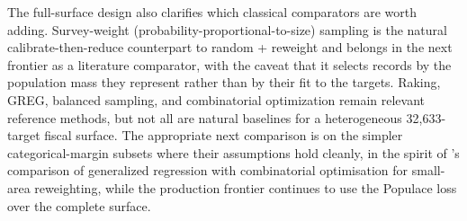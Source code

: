 The full-surface design also clarifies which classical comparators are worth adding. Survey-weight
(probability-proportional-to-size) sampling is the natural calibrate-then-reduce counterpart to random +
reweight and belongs in the next frontier as a literature comparator, with the caveat that it selects
records by the population mass they represent rather than by their fit to the targets. Raking, GREG,
balanced sampling, and combinatorial optimization remain relevant reference methods, but not all are
natural baselines for a heterogeneous
32{,}633-target fiscal surface. The appropriate next comparison is on the simpler categorical-margin
subsets where their assumptions hold cleanly, in the spirit of \citet{tanton2014co}'s comparison of
generalized regression with combinatorial optimisation for small-area reweighting, while the production
frontier continues to use the Populace loss over the complete surface.
